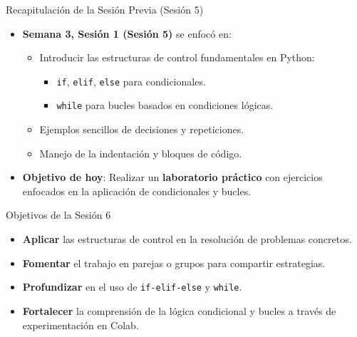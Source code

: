 \documentclass[10pt]{beamer}
\begin{document}
\begin{frame}{Recapitulación de la Sesión Previa (Sesión 5)}
  \begin{itemize}
    \item \textbf{Semana 3, Sesión 1 (Sesión 5)} se enfocó en:
      \begin{itemize}
        \item Introducir las estructuras de control fundamentales en Python:
          \begin{itemize}
            \item \texttt{if}, \texttt{elif}, \texttt{else} para condicionales.
            \item \texttt{while} para bucles basados en condiciones lógicas.
          \end{itemize}
        \item Ejemplos sencillos de decisiones y repeticiones.
        \item Manejo de la indentación y bloques de código.
      \end{itemize}
    \item \textbf{Objetivo de hoy}: Realizar un \textbf{laboratorio práctico} con ejercicios enfocados en la aplicación de condicionales y bucles.
  \end{itemize}
\end{frame}

\begin{frame}{Objetivos de la Sesión 6}
  \begin{itemize}
    \item \textbf{Aplicar} las estructuras de control en la resolución de problemas concretos.
    \item \textbf{Fomentar} el trabajo en parejas o grupos para compartir estrategias.
    \item \textbf{Profundizar} en el uso de \texttt{if-elif-else} y \texttt{while}.
    \item \textbf{Fortalecer} la comprensión de la lógica condicional y bucles a través de experimentación en Colab.
  \end{itemize}
\end{frame}
\end{document}
